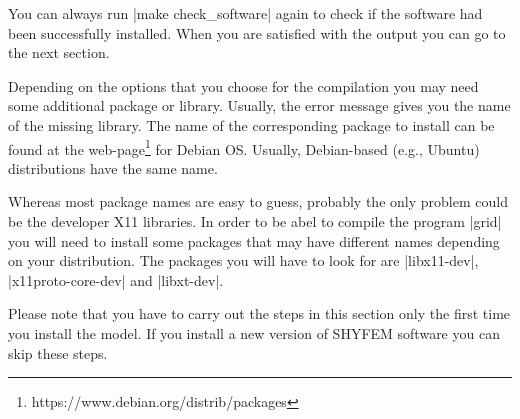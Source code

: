 You can always run |make check_software| again to check if the software
had been successfully installed. When you are satisfied with the output
you can go to the next section.

Depending on the options that you choose for the compilation you may
need some additional package or library. Usually, the error message
gives you the name of the missing library. The name of the corresponding
package to install can be found at the 
web-page\footnote{https://www.debian.org/distrib/packages} for Debian OS.
Usually, Debian-based (e.g., Ubuntu) distributions have the same name.

Whereas most package names are easy to guess, probably the only problem 
could be the developer X11 libraries. In order to be abel to compile the
program |grid| you will need to install some packages that may have
different names depending on your distribution. The packages you will
have to look for are |libx11-dev|, |x11proto-core-dev| and |libxt-dev|.

Please note that you have to carry out the steps in this section only
the first time you install the model. If you install a new version of
SHYFEM software you can skip these steps.

